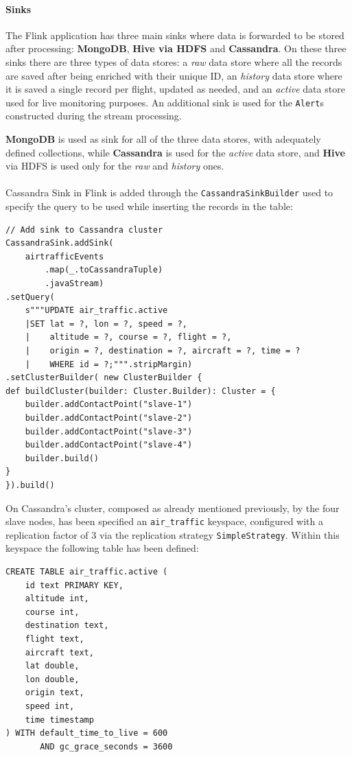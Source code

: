\paragraph{Sinks}

The Flink application has three main sinks where data is forwarded to be stored after processing: \textbf{MongoDB}, \textbf{Hive via HDFS} and \textbf{Cassandra}. On these three sinks there are three types of data stores: a \textit{raw} data store where all the records are saved after being enriched with their unique ID, an \textit{history} data store where it is saved a single record per flight, updated as needed, and an \textit{active} data store used for live monitoring purposes. An additional sink is used for the \texttt{Alert}s constructed during the stream processing.

\textbf{MongoDB} is used as sink for all of the three data stores, with adequately defined collections, while \textbf{Cassandra} is used for the \textit{active} data store, and \textbf{Hive} via HDFS is used only for the \textit{raw} and \textit{history} ones.
\\\\
Cassandra Sink in Flink is added through the \texttt{CassandraSinkBuilder} used to specify the query to be used while inserting the records in the table:

\begin{verbatim}
// Add sink to Cassandra cluster
CassandraSink.addSink(
    airtrafficEvents
        .map(_.toCassandraTuple)
        .javaStream)
.setQuery(
    s"""UPDATE air_traffic.active
    |SET lat = ?, lon = ?, speed = ?,
    |    altitude = ?, course = ?, flight = ?,
    |    origin = ?, destination = ?, aircraft = ?, time = ?
    |    WHERE id = ?;""".stripMargin)
.setClusterBuilder( new ClusterBuilder {
def buildCluster(builder: Cluster.Builder): Cluster = {   
    builder.addContactPoint("slave-1")
    builder.addContactPoint("slave-2")
    builder.addContactPoint("slave-3")
    builder.addContactPoint("slave-4")
    builder.build()
}
}).build()
\end{verbatim}

On Cassandra's cluster, composed as already mentioned previously, by the four slave nodes, has been specified an \texttt{air\_traffic} keyspace, configured with a replication factor of 3 via the replication strategy \texttt{SimpleStrategy}. Within this keyspace the following table has been defined:

\begin{verbatim}
CREATE TABLE air_traffic.active (
    id text PRIMARY KEY,
    altitude int,
    course int,
    destination text,
    flight text,
    aircraft text,
    lat double,
    lon double,
    origin text,
    speed int,
    time timestamp
) WITH default_time_to_live = 600
       AND gc_grace_seconds = 3600
\end{verbatim}

